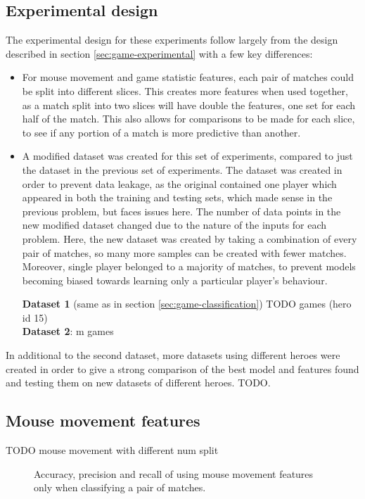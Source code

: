 \documentclass[Report.tex]{subfiles}
\newcommand{\baraxis}[7]{
\begin{axis}[
    ybar,
    title={#1},
    width=#5,
    height=#6,
    ymin=#3, ymax=#4,
    bar width=1em,
    legend style={at={#7},anchor=north,legend columns=-1},
    enlarge x limits=0.4,
    x tick label style={align=center,text width=1.7cm},
    symbolic x coords={Logistic Regression, Random Forest, Multi-layer Perceptron},
    xtick=data,
    ylabel={#2}
]
}
\newcommand{\plotbar}[5]{
\addplot+[
	discard if not={numSplits}{#1},
	discard if not={split}{#2},
	discard if not={features}{#3},
] table [x=model, y=#4,col sep=comma] {data/20-pair-cv.csv};
\addlegendentry{#5}
}
\begin{document}
\subsection{Experimental design}
The experimental design for these experiments follow largely from the design described in section \ref{sec:game-experimental} with a few key differences:
\begin{itemize}
\item For mouse movement and game statistic features, each pair of matches could be split into different slices. This creates more features when used together, as a match split into two slices will have double the features, one set for each half of the match. This also allows for comparisons to be made for each slice, to see if any portion of a match is more predictive than another. 
\item A modified dataset was created for this set of experiments, compared to just the dataset in the previous set of experiments. The dataset was created in order to prevent data leakage, as the original contained one player which appeared in both the training and testing sets, which made sense in the previous problem, but faces issues here. The number of data points in the new modified dataset changed due to the nature of the inputs for each problem. Here, the new dataset was created by taking a combination of every pair of matches, so many more samples can be created with fewer matches. Moreover, single player belonged to a majority of matches, to prevent models becoming biased towards learning only a particular player's behaviour.  

\textbf{Dataset 1} (same as in section \ref{sec:game-classification}) TODO games (hero id 15) \\
\textbf{Dataset 2}: m games
\end{itemize}

In additional to the second dataset, more datasets using different heroes were created in order to give a strong comparison of the best model and features found and testing them on new datasets of different heroes. TODO. 

\subsection{Mouse movement features}

TODO mouse movement with different num split

\begin{figure}[H]
\centering
{}
\caption{Accuracy, precision and recall of using mouse movement features only when classifying a pair of matches.}
\end{figure}
\end{document}
